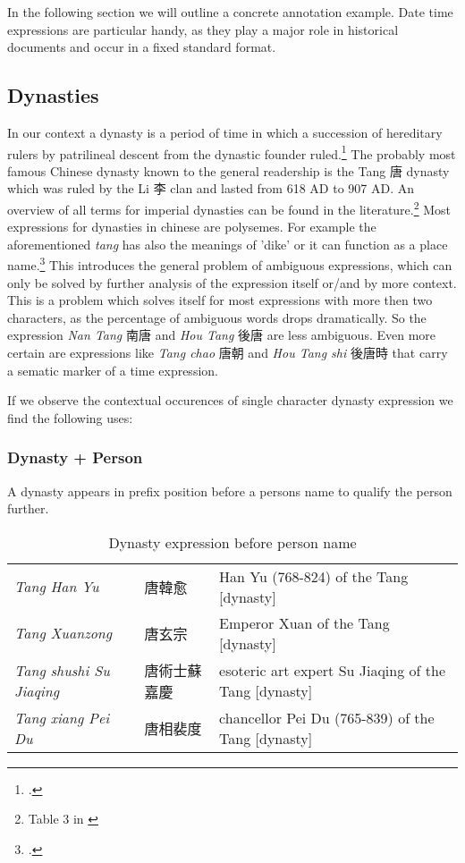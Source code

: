 \documentclass[12pt, draft]{article}
\begin{document}
In the following section we will outline a concrete annotation example.
Date time expressions are particular handy, as they play a major role in 
historical documents and occur in a fixed standard format.

\subsection{Dynasties}

In our context a dynasty is a period of time in which a succession of hereditary
rulers by patrilineal descent from the dynastic founder ruled.\footcite[3]{Wilkinson:2012} 
The probably most famous Chinese dynasty known to the general readership
is the Tang 唐 dynasty which was ruled by the Li 李 clan and lasted from 618 AD to 907 AD.
An overview of all terms for imperial dynasties can be found in the literature.\footnote{
Table 3 in \cite[4]{Wilkinson:2012}}
Most expressions for dynasties in chinese are polysemes. For example the aforementioned
\emph{tang} has also the meanings of 'dike' or it can function as a place name.\footcite[117]{Wang:2000}
This introduces the general problem of ambiguous expressions, which can only be solved
by further analysis of the expression itself or/and by more context. This is a problem
which solves itself for most expressions with more then two characters, as the percentage
of ambiguous words drops dramatically. So the expression \emph{Nan Tang} 南唐
and \emph{Hou Tang} 後唐 are less ambiguous. Even more certain are expressions like
\emph{Tang chao} 唐朝 and \emph{Hou Tang shi} 後唐時 that carry a sematic marker
of a time expression.

If we observe the contextual occurences of single character dynasty expression we find the
following uses:

\subsubsection{Dynasty + Person}
A dynasty appears in prefix position before a persons name to qualify the person further.

{\tiny
\begin{table}[h]
\caption{Dynasty expression before person name}
\begin{tabular}{lll}
\emph{Tang Han Yu} & 唐韓愈 & Han Yu (768-824) of the Tang [dynasty] \\
\emph{Tang Xuanzong} & 唐玄宗 & Emperor Xuan of the Tang [dynasty] \\
\emph{Tang shushi Su Jiaqing} &  唐術士蘇嘉慶 & esoteric art expert Su Jiaqing of the Tang [dynasty] \\
\emph{Tang xiang Pei Du} &  唐相裴度 & chancellor Pei Du (765-839) of the Tang [dynasty] \\
\end{tabular}
\end{table}
}
\end{document}
